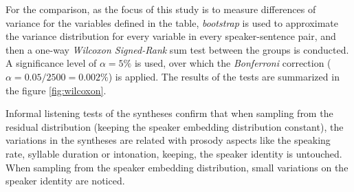 For the comparison, as the focus of this study is to measure differences of variance for the variables defined in the table, \textit{bootstrap} is used to approximate the variance distribution for every variable in every speaker-sentence pair, and then a one-way \textit{Wilcoxon Signed-Rank} sum test between the groups is conducted. A significance level of $\alpha=5\%$ is used, over which the \textit{Bonferroni} correction ($\alpha=0.05/2500=0.002\%$) is applied. The results of the tests are summarized in the figure \ref{fig:wilcoxon}.

Informal listening tests of the syntheses confirm that when sampling from the residual distribution (keeping the speaker embedding distribution constant), the variations in the syntheses are related with prosody aspects like the speaking rate, syllable duration or intonation, keeping, the speaker identity is untouched. When sampling from the speaker embedding distribution, small variations on the speaker identity are noticed.



